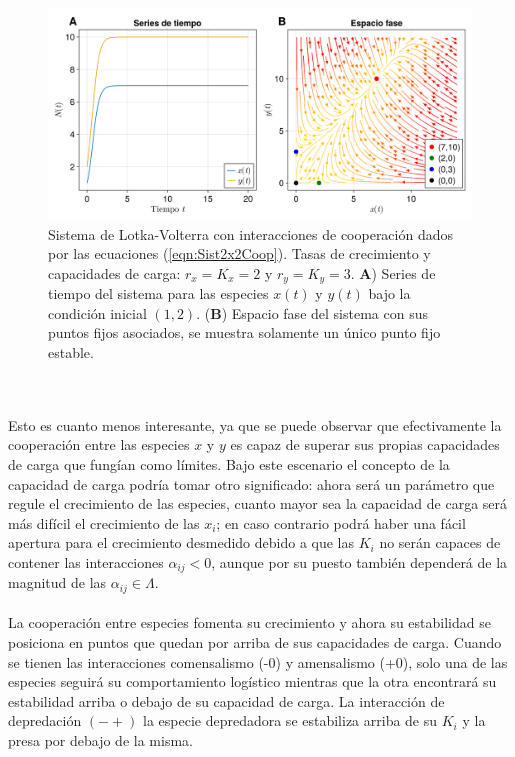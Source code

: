 \begin{ejemplo}
	\begin{figure}[h!]
		\centering
		\includegraphics[scale=0.24]{../Imagenes/Cooperacion de especies}
		\caption{Sistema de Lotka-Volterra con interacciones de cooperación dados por las ecuaciones (\ref{eqn:Sist2x2Coop}). Tasas de crecimiento y capacidades de carga: $r_x=K_x=2$ y $r_y=K_y=3$. \textbf{A}) Series de tiempo del sistema para las especies $x(t)$ y $y(t)$ bajo la condición inicial $(1,2)$. (\textbf{B}) Espacio fase del sistema con sus puntos fijos asociados, se muestra solamente un único punto fijo estable.}
		\label{fig:CooperacionEspecies}
	\end{figure}\\
	\\
	 Esto es cuanto menos interesante, ya que se puede observar que efectivamente la cooperación entre las especies $x$ y $y$ es capaz de superar sus propias capacidades de carga que fungían como límites. Bajo este escenario el concepto de la capacidad de carga podría tomar otro significado: ahora será un parámetro que regule el crecimiento de las especies, cuanto mayor sea la capacidad de carga será más difícil el crecimiento de las $x_i$; en caso contrario podrá haber una fácil apertura para el crecimiento desmedido debido a que las $K_i$ no serán capaces de contener las interacciones $\alpha_{ij}<0$, aunque por su puesto también dependerá de la magnitud de las $\alpha_{ij}\in\Lambda$.\\
	 \\
 	La cooperación entre especies fomenta su crecimiento y ahora su estabilidad se posiciona en puntos que quedan por arriba de sus capacidades de carga. Cuando se tienen las interacciones comensalismo (-0) y amensalismo (+0), solo una de las especies seguirá su comportamiento logístico mientras que la otra encontrará su estabilidad arriba o debajo de su capacidad de carga. La interacción de depredación $(-+)$ la especie depredadora se estabiliza arriba de su $K_i$ y la presa por debajo de la misma.\\

\end{ejemplo}

